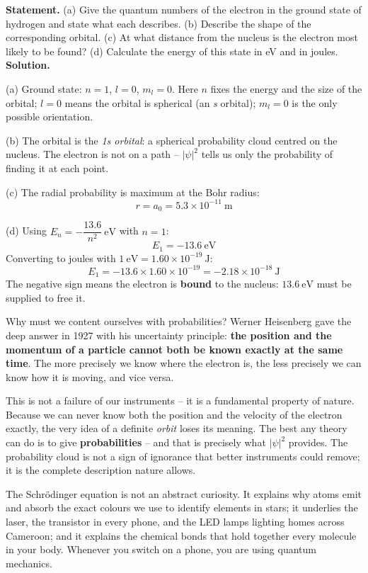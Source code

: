 \documentclass[11pt]{article}
\newcommand{\cle}[1]{{\popxbold\color{popdark}#1}}
\newcounter{popsec}
\newcounter{popsub}
\newcommand{\courssub}[1]{%
  \stepcounter{popsub}%
  \par\vspace{9pt}\noindent{\popxbold\fontsize{11.5}{13}\selectfont\color{popink}{\color{poporange}\thepopsec.\thepopsub}\hspace{6pt}#1}\par\nopagebreak\vspace{4pt}
}
\begin{document}
\begin{exoresolu}
\textbf{Statement.} (a) Give the quantum numbers of the electron in the ground state of hydrogen and state what each describes. (b) Describe the shape of the corresponding orbital. (c) At what distance from the nucleus is the electron most likely to be found? (d) Calculate the energy of this state in eV and in joules.
\tcblower
\textbf{Solution.}

(a) Ground state: $n = 1$, $l = 0$, $m_l = 0$. Here $n$ fixes the energy and the size of the orbital; $l = 0$ means the orbital is spherical (an \emph{s} orbital); $m_l = 0$ is the only possible orientation.

(b) The orbital is the \emph{1s orbital}: a spherical probability cloud centred on the nucleus. The electron is not on a path -- $|\psi|^2$ tells us only the probability of finding it at each point.

(c) The radial probability is maximum at the Bohr radius:
\[
r = a_0 = 5.3\times 10^{-11}\ \mathrm{m}
\]

(d) Using $E_n = -\dfrac{13.6}{n^2}\ \mathrm{eV}$ with $n = 1$:
\[
E_1 = -13.6\ \mathrm{eV}
\]
Converting to joules with $1\ \mathrm{eV} = 1.60\times 10^{-19}\ \mathrm{J}$:
\[
E_1 = -13.6 \times 1.60\times 10^{-19} = -2.18\times 10^{-18}\ \mathrm{J}
\]
The negative sign means the electron is \textbf{bound} to the nucleus: $13.6\ \mathrm{eV}$ must be supplied to free it.
\end{exoresolu}

\courssub{Heisenberg's uncertainty idea}

Why must we content ourselves with probabilities? Werner Heisenberg gave the deep answer in 1927 with his \cle{uncertainty principle}: \textbf{the position and the momentum of a particle cannot both be known exactly at the same time}. The more precisely we know where the electron is, the less precisely we can know how it is moving, and vice versa.

This is not a failure of our instruments -- it is a fundamental property of nature. Because we can never know both the position and the velocity of the electron exactly, the very idea of a definite \emph{orbit} loses its meaning. The best any theory can do is to give \textbf{probabilities} -- and that is precisely what $|\psi|^2$ provides. The probability cloud is not a sign of ignorance that better instruments could remove; it is the complete description nature allows.

\begin{savaistu}
The Schrödinger equation is not an abstract curiosity. It explains why atoms emit and absorb the exact colours we use to identify elements in stars; it underlies the laser, the transistor in every phone, and the LED lamps lighting homes across Cameroon; and it explains the chemical bonds that hold together every molecule in your body. Whenever you switch on a phone, you are using quantum mechanics.
\end{savaistu}
\end{document}
